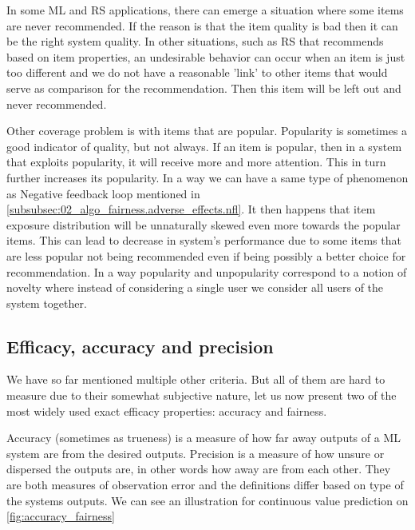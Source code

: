 In some ML and RS applications, there can emerge a situation where some items are never recommended. If the reason is that the item quality is bad then it can be the right system quality. In other situations, such as RS that recommends based on item properties, an undesirable behavior can occur when an item is just too different and we do not have a reasonable 'link' to other items that would serve as comparison for the recommendation. Then this item will be left out and never recommended.

Other coverage problem is with items that are popular. Popularity is sometimes a good indicator of quality, but not always. If an item is popular, then in a system that exploits popularity, it will receive more and more attention. This in turn further increases its popularity. In a way we can have a same type of phenomenon as Negative feedback loop mentioned in \ref{subsubsec:02_algo_fairness.adverse_effects.nfl}. It then happens that item exposure distribution will be unnaturally skewed even more towards the popular items. This can lead to decrease in system's performance due to some items that are less popular not being recommended even if being possibly a better choice for recommendation. In a way popularity and unpopularity correspond to a notion of novelty where instead of considering a single user we consider all users of the system together.

%

\subsection{Efficacy, accuracy and precision}
We have so far mentioned multiple other criteria. But all of them are hard to measure due to their somewhat subjective nature, let us now present two of the most widely used exact efficacy properties: accuracy and fairness.

Accuracy (sometimes as trueness) is a measure of how far away outputs of a ML system are from the desired outputs. Precision is a measure of how unsure or dispersed the outputs are, in other words how away are from each other. They are both measures of observation error and the definitions differ based on type of the systems outputs. We can see an illustration for continuous value prediction on \ref{fig:accuracy_fairness}

